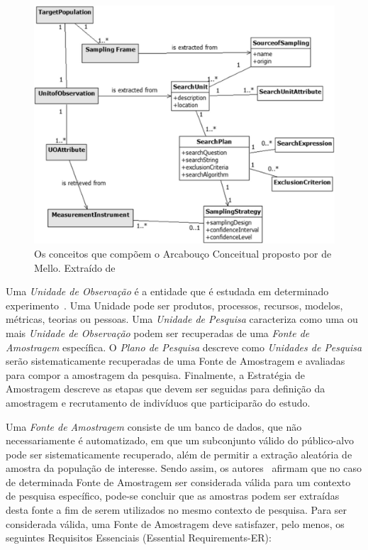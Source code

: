 \begin{figure}[htpb]
	\centering
	\includegraphics[width=0.8\linewidth]{./chapter-pesquisa-com-profissionais/img/framework-amostragem.png}
	\caption{Os conceitos que compõem o Arcabouço Conceitual proposto por de
		Mello. Extraído de~\cite{de2015investigating}}
\label{fig:framework-amostragem}
\end{figure}

Uma \textit{Unidade de Observação} é a entidade que é estudada em determinado
experimento~\cite{wohlin2012experimentation}. Uma Unidade pode ser produtos,
processos, recursos, modelos, métricas, teorias ou pessoas. Uma \textit{Unidade
	de Pesquisa} caracteriza como uma ou mais \textit{Unidade de Observação}
podem ser recuperadas de uma \textit{Fonte de Amostragem} específica. O
\textit{Plano de Pesquisa} descreve como \textit{Unidades de Pesquisa} serão
sistematicamente recuperadas de uma Fonte de Amostragem e avaliadas para compor
a amostragem da pesquisa. Finalmente, a Estratégia de Amostragem descreve as
etapas que devem ser seguidas para definição da amostragem e recrutamento de
indivíduos que participarão do estudo.

Uma \textit{Fonte de Amostragem} consiste de um banco de dados, que não
necessariamente é automatizado, em que um subconjunto válido do público-alvo
pode ser sistematicamente recuperado, além de permitir a extração aleatória de
amostra da população de interesse. Sendo assim, os autores~\cite{de2014towards}
afirmam que no caso de determinada Fonte de Amostragem ser considerada válida
para um contexto de pesquisa específico, pode-se concluir que as amostras podem
ser extraídas desta fonte a fim de serem utilizados no mesmo contexto de
pesquisa. Para ser considerada válida, uma Fonte de Amostragem deve satisfazer,
pelo menos, os seguintes Requisitos Essenciais (Essential Requirements\@-\@ ER):


